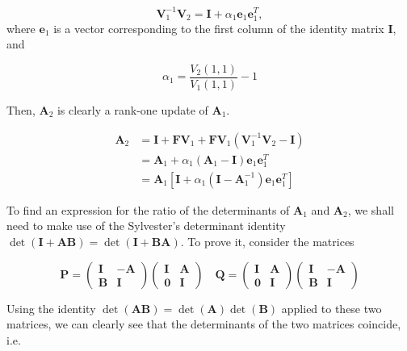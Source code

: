 \begin{equation}
\bm V_1^{-1} \bm V_2 = \bm I + \alpha_1 \bm e_1 \bm e_1^T ,
\end{equation}
where $\bm e_1$ is a vector corresponding to the first column of the identity matrix $\bm I$, and

\begin{equation}
\alpha_1 = \frac{V_2(1,1)}{V_1(1,1)} - 1
\end{equation}

Then, $\bm A_2$ is clearly a rank-one update of $\bm A_1$.

\begin{equation}\label{eq:a2}
\begin{split}
\bm A_2 &= \bm I + \bm F \bm V_1 + \bm F \bm V_1 ( \bm V_1^{-1} \bm V_2 - \bm I ) \\
&= \bm A_1 + \alpha_1 ( \bm A_1 - \bm I ) \bm e_1 \bm e_1^T \\
&= \bm A_1 [ \bm I + \alpha_1 ( \bm I - \bm A_1^{-1} )\bm e_1 \bm e_1^T ]
\end{split}
\end{equation}

To find an expression for the ratio of the determinants of $\bm A_1$ and $\bm A_2$, we shall need to make use of the Sylvester's determinant identity $\det(\bm I + \bm A \bm B ) = \det (\bm I + \bm B \bm A )$.
To prove it, consider the matrices

\begin{equation}
\bm P =
\begin{pmatrix}
\bm I & - \bm A \\
\bm B & \bm I 
\end{pmatrix}
\begin{pmatrix}
\bm I &  \bm A \\
\bm 0 & \bm I 
\end{pmatrix}
\quad
\bm Q =
\begin{pmatrix}
\bm I &  \bm A \\
\bm 0 & \bm I 
\end{pmatrix}
\begin{pmatrix}
\bm I &  -\bm A \\
\bm B & \bm I 
\end{pmatrix}
\end{equation}

Using the identity $\det ( \bm A \bm B ) = \det ( \bm A ) \det ( \bm B )$ applied to these two matrices, we can clearly see that the determinants of the two matrices coincide, i.e.

